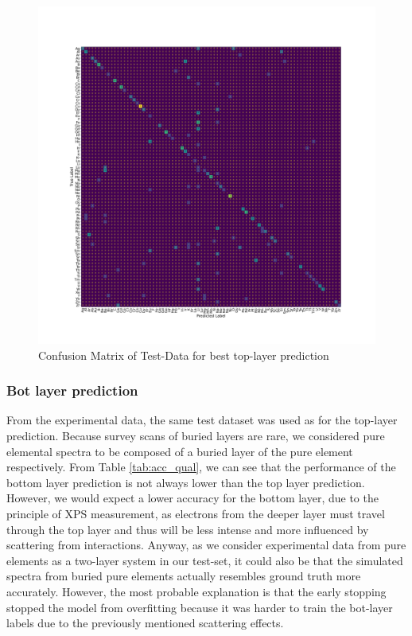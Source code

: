 \begin{center}
\begin{figure}[H]
        \centerline{\includegraphics[width=1.4\textwidth]{Figures/best_task_1_model_CM.png}}
    \centering
    \caption{Confusion Matrix of Test-Data for best top-layer prediction}
    \label{cm_cnn_1l}
\end{figure}
\end{center}



\subsubsection{Bot layer prediction}


From the experimental data, the same test dataset was used as for the top-layer prediction. Because survey scans of buried layers are rare, we considered pure elemental spectra to be composed of a buried layer of the pure element respectively.
From Table \ref{tab:acc_qual}, we can see that the performance of the bottom layer prediction is not always lower than the top layer prediction. However, we would expect a lower accuracy for the bottom layer, due to the principle of XPS measurement, as electrons from the deeper layer must travel through the top layer and thus will be less intense and more influenced by scattering from interactions. Anyway, as we consider experimental data from pure elements as a two-layer system in our test-set, it could also be that the simulated spectra from buried pure elements actually resembles ground truth more accurately. However, the most probable explanation is that the early stopping stopped the model from overfitting because it was harder to train the bot-layer labels due to the previously mentioned scattering effects.




